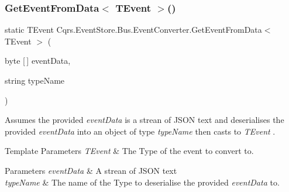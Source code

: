 \subsubsection{\texorpdfstring{Get\+Event\+From\+Data$<$ T\+Event $>$()}{GetEventFromData< TEvent >()}}
{\footnotesize\ttfamily static T\+Event Cqrs.\+Event\+Store.\+Bus.\+Event\+Converter.\+Get\+Event\+From\+Data$<$ T\+Event $>$ (\begin{DoxyParamCaption}\item[{byte \mbox{[}$\,$\mbox{]}}]{event\+Data,  }\item[{string}]{type\+Name }\end{DoxyParamCaption})\hspace{0.3cm}{\ttfamily [static]}}



Assumes the provided {\itshape event\+Data}  is a strean of J\+S\+ON text and deserialises the provided {\itshape event\+Data}  into an object of type {\itshape type\+Name}  then casts to {\itshape T\+Event} . 


\begin{DoxyTemplParams}{Template Parameters}
{\em T\+Event} & The Type of the event to convert to.\\
\hline
\end{DoxyTemplParams}

\begin{DoxyParams}{Parameters}
{\em event\+Data} & A strean of J\+S\+ON text\\
\hline
{\em type\+Name} & The name of the Type to deserialise the provided {\itshape event\+Data}  to.\\
\hline
\end{DoxyParams}
